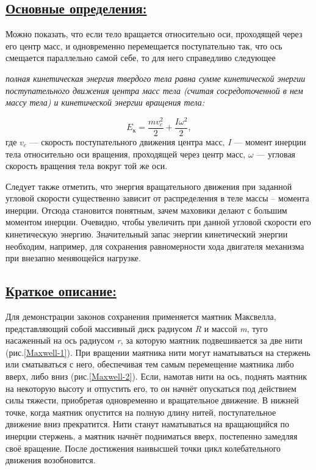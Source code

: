 \documentclass[14pt,a4paper,oneside]{extarticle}	%
\begin{document}
	\newpage
		\subsection*{\underline{Основные определения:}}
		
	Можно показать, что если тело вращается относительно оси, проходящей через его центр масс, и одновременно перемещается поступательно так, что ось смещается параллельно самой себе, то для него справедливо следующее 
	\begin{flushleft}
		\textit{полная кинетическая энергия твердого тела равна сумме кинетической энергии поступательного движения центра масс тела (считая сосредоточенной в нем массу тела) и кинетической энергии вращения тела:}
	\end{flushleft}
$$ E_\text{к} = \frac{mv_c^2}{2} + \frac{I\omega^2}{2}, $$
где $ v_c $ — скорость поступательного движения центра масс, \textit{I} — момент инерции тела относительно оси вращения, проходящей через центр масс, $ \omega $ — угловая скорость вращения тела вокруг той же оси.

Следует также отметить, что энергия вращательного движения при заданной угловой скорости существенно зависит от распределения в теле массы – момента инерции.
Отсюда становится понятным, зачем маховики делают с большим моментом инерции.
Очевидно, чтобы увеличить при данной угловой скорости его кинетическую энергию.
Значительный запас энергии кинетический энергии необходим, например, для сохранения равномерности хода двигателя механизма при внезапно меняющейся нагрузке.
	
	\newpage
	\subsection*{\underline{Краткое описание:}}
	
	Для демонстрации законов сохранения применяется маятник Максвелла, представляющий собой массивный диск радиусом \textit{R} и массой \textit{m}, туго насаженный на ось радиусом \textit{r}, за которую маятник подвешивается за две нити (рис.\ref{Maxwell-1}).
	При вращении маятника нити могут наматываться на стержень или сматываться с него, обеспечивая тем самым перемещение маятника либо вверх, либо вниз (рис.\ref{Maxwell-2}).
	Если, намотав нити на ось, поднять маятник на некоторую высоту и отпустить его, то он начнёт опускаться под действием силы тяжести, приобретая одновременно и вращательное движение. В нижней точке, когда маятник опустится на полную длину нитей, поступательное движение вниз прекратится. Нити станут наматываться на вращающийся по инерции стержень, а маятник начнёт подниматься вверх, постепенно замедляя своё вращение. После достижения наивысшей точки цикл колебательного движения возобновится.
	
\end{document}
